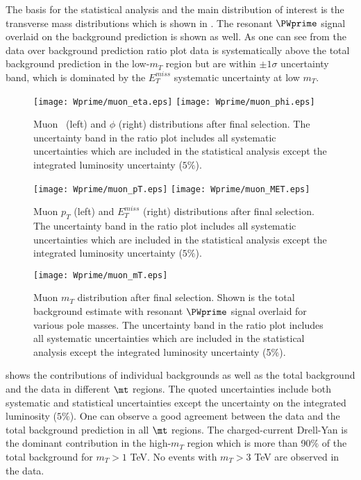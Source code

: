 The basis for the statistical analysis and the main distribution of interest 
is the transverse mass distributions which is shown in .
The resonant $\PWprime$ signal overlaid on the background prediction is shown as well.
As one can see from the data over background prediction ratio plot data is systematically above the total background prediction
in the low-$m_T$ region but are within $\pm 1 \sigma$ uncertainty band, which is dominated by the $E_T^{miss}$ systematic uncertainty at low $m_T$.

\begin{figure}[]
  \centering
  \texttt{[image: Wprime/muon\_eta.eps]}
  \texttt{[image: Wprime/muon\_phi.eps]}
  \caption{
  Muon \eta\ (left) and $\phi$ (right) distributions after final selection. The uncertainty band in the ratio plot includes all systematic uncertainties which are included in the statistical analysis except the integrated luminosity uncertainty ($5\%$).
}
  \label{fig:mu_results_etaphi}
\end{figure}

\begin{figure}[]
  \centering
  \texttt{[image: Wprime/muon\_pT.eps]}
  \texttt{[image: Wprime/muon\_MET.eps]}
 \caption{
 Muon $p_T$ (left) and $E_T^{miss}$ (right) distributions after final selection. The uncertainty band in the ratio plot includes all systematic uncertainties which are included in the statistical analysis except the integrated luminosity uncertainty ($5\%$).
}
  \label{fig:mu_results_ptmet}
\end{figure}


\begin{figure}[]
  \centering
  \texttt{[image: Wprime/muon\_mT.eps]}
  \caption{
  Muon $m_T$ distribution after final selection. 
  Shown is the total background estimate with resonant $\PWprime$ signal overlaid for various pole masses. 
  The uncertainty band in the ratio plot includes all systematic uncertainties which are included in the statistical analysis except the integrated luminosity uncertainty (5$\%$).}
  \label{fig:MT_mu_Wprime}
\end{figure}

shows the contributions of individual backgrounds as well as the total background
and the data in different $\mt$ regions. The quoted uncertainties include both systematic and
statistical uncertainties except the uncertainty on the integrated luminosity ($5\%$).
One can observe a good agreement between the data and the total background prediction in all $\mt$ regions. The charged-current Drell-Yan is the dominant contribution in the high-$m_T$ region which is more than 90$\%$ of the total background for $m_T>1$ TeV. No events with $m_T > 3$ TeV are observed in the data.


